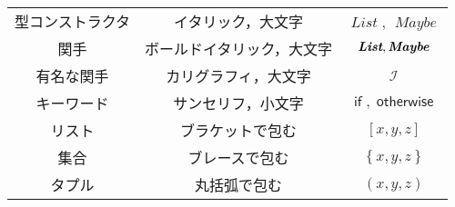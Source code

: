 \documentclass[a4paper,draft]{jsbook}
\newcommand{\mFunctor}[1]{\textit{\textbf{#1}}}
\newcommand{\mSpecialFunctor}[1]{\mathcal{#1}} %
\newcommand{\mTypeConstructor}[1]{\mathit{#1}} %
\newcommand{\mKeyword}[1]{\mathsf{#1}}
\newcommand{\mIfKeyword}{\mKeyword{if}}
\newcommand{\mOtherwiseKeyword}{\mKeyword{otherwise}}
\newcommand{\mListOf}[1]{\left[#1\right]}
\newcommand{\mSetOf}[1]{\left\{#1\right\}}
\newcommand{\mTupleOf}[1]{\left(#1\right)}
\DeclareMathOperator{\mListTypeConstructor}{\mTypeConstructor{List}}
\DeclareMathOperator{\mMaybeTypeConstructor}{\mTypeConstructor{Maybe}}
\DeclareMathOperator{\mIFunctor}{\mSpecialFunctor{I}}
\DeclareMathOperator{\mIf}{\mIfKeyword}
\DeclareMathOperator{\mOtherwise}{\mOtherwiseKeyword}
\newcommand{\mathVarKeyword}[1]{\operatorname{\mathrm{#1}}}
\newcommand{\mathRest}{\mathVarKeyword{rest}}
\begin{document}
\begin{table*}
\begin{center}
\begin{tabular}{||c|c|c||}
\hline
型コンストラクタ&イタリック，大文字&$\mListTypeConstructor$, $\mMaybeTypeConstructor$\\
関手&ボールドイタリック，大文字&$\mFunctor{List},\mFunctor{Maybe}$\\
有名な関手&カリグラフィ，大文字&$\mIFunctor$\\
\hline
キーワード&サンセリフ，小文字&$\mIf,\mOtherwise$\\
\hline
リスト&ブラケットで包む&$\mListOf{x,y,z}$\\
集合&ブレースで包む&$\mSetOf{x,y,z}$\\
タプル&丸括弧で包む&$\mTupleOf{x,y,z}$\\
\hline
\end{tabular}
\end{center}
\end{table*}
\end{document}
